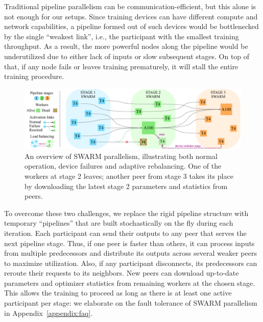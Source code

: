 Traditional pipeline parallelism can be communication-efficient, but this alone is not enough for our setups. Since training devices can have different compute and network capabilities, a pipeline formed out of such devices would be bottlenecked by the single ``weakest link'', i.e., the participant with the smallest training throughput. As a result, the more powerful nodes along the pipeline would be underutilized due to either lack of inputs or slow subsequent stages. On top of that, if any node fails or leaves training prematurely, it will stall the entire training procedure.

\begin{figure}[t]
    \centering
    \includegraphics[width=\linewidth]{resources/swarm_v2_max.pdf}
    \caption{An overview of SWARM parallelism, illustrating both normal operation, device failures and adaptive rebalancing. One of the workers at stage 2 leaves; another peer from stage 3 takes its place by downloading the latest stage 2 parameters and statistics from peers.}
    \label{fig:swarm}
    \vspace{-12pt}
\end{figure}

To overcome these two challenges, we replace the rigid pipeline structure with temporary ``pipelines'' that are built stochastically on the fly during each iteration. Each participant can send their outputs to any peer that serves the next pipeline stage. Thus, if one peer is faster than others, it can process inputs from multiple predecessors and distribute its outputs across several weaker peers to maximize utilization. Also, if any participant disconnects, its predecessors can reroute their requests to its neighbors. New peers can download up-to-date parameters and optimizer statistics from remaining workers at the chosen stage. This allows the training to proceed as long as there is at least one active participant per stage: we elaborate on the fault tolerance of SWARM parallelism in Appendix~\ref{appendix:faq}.


